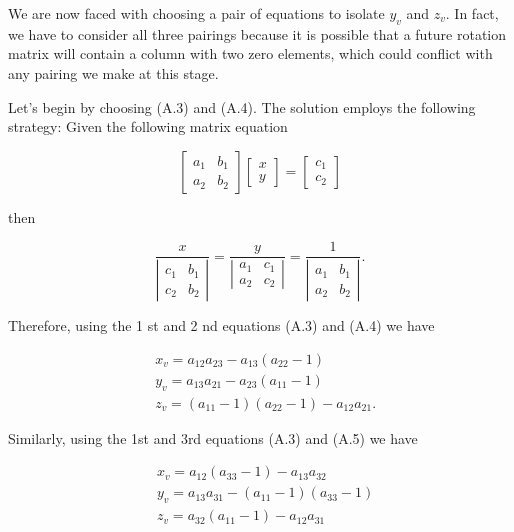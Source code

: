 We are now faced with choosing a pair of equations to isolate $y_{v}$ and $z_{v}$. In fact, we have to consider all three pairings because it is possible that a future rotation matrix will contain a column with two zero elements, which could conflict with any pairing we make at this stage.

Let's begin by choosing (A.3) and (A.4). The solution employs the following strategy: Given the following matrix equation

$$
\left[\begin{array}{ll}
a_{1} & b_{1} \\
a_{2} & b_{2}
\end{array}\right]\left[\begin{array}{l}
x \\
y
\end{array}\right]=\left[\begin{array}{l}
c_{1} \\
c_{2}
\end{array}\right]
$$

then

$$
\frac{x}{\left|\begin{array}{ll}
c_{1} & b_{1} \\
c_{2} & b_{2}
\end{array}\right|}=\frac{y}{\left|\begin{array}{ll}
a_{1} & c_{1} \\
a_{2} & c_{2}
\end{array}\right|}=\frac{1}{\left|\begin{array}{ll}
a_{1} & b_{1} \\
a_{2} & b_{2}
\end{array}\right|} .
$$

Therefore, using the 1 st and 2 nd equations (A.3) and (A.4) we have

$$
\begin{aligned}
& x_{v}=a_{12} a_{23}-a_{13}\left(a_{22}-1\right) \\
& y_{v}=a_{13} a_{21}-a_{23}\left(a_{11}-1\right) \\
& z_{v}=\left(a_{11}-1\right)\left(a_{22}-1\right)-a_{12} a_{21} .
\end{aligned}
$$

Similarly, using the 1st and 3rd equations (A.3) and (A.5) we have

$$
\begin{aligned}
& x_{v}=a_{12}\left(a_{33}-1\right)-a_{13} a_{32} \\
& y_{v}=a_{13} a_{31}-\left(a_{11}-1\right)\left(a_{33}-1\right) \\
& z_{v}=a_{32}\left(a_{11}-1\right)-a_{12} a_{31}
\end{aligned}
$$


